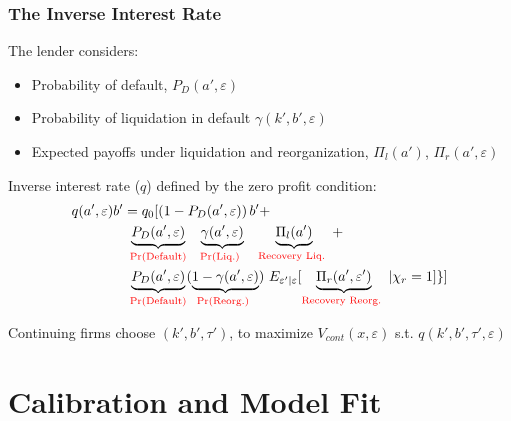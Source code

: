 \documentclass[aspectratio=169,xcolor=table]{beamer}
\begin{document}
\begin{frame}[label=Qfull] \frametitle{The Inverse Interest Rate  \hfill \hyperlink{mechanism}{} \hyperlink{ContFirms}{}}

The lender considers: \small 
\begin{itemize}\setlength\itemsep{0em} 
    \item Probability of default, $P_D(a', \varepsilon)$
    \item Probability of liquidation in default $\gamma(k',b', \varepsilon)$
    \item Expected payoffs under liquidation and reorganization,  $\Pi_{l}(a')$, $\Pi_{r}(a', \varepsilon)$
\end{itemize} \normalsize

Inverse interest rate ($q$) defined by the zero profit condition:
\begin{equation*} \label{eq:q}
    \begin{split}
        & q(a', \varepsilon)b' = q_0 [ \left(1-P_D(a', \varepsilon)\right)b' +  \\
        & \qquad \qquad \underbrace{P_D(a', \varepsilon)}_{\textcolor{red}{\text{Pr(Default)}}} \underbrace{\gamma(a', \varepsilon)}_{\textcolor{red}{\text{\quad Pr(Liq.) \quad }}} \underbrace{\Pi_{l}(a')}_{\textcolor{red}{\text{Recovery Liq. }}} + \\  
        & \qquad  \qquad \underbrace{P_D(a', \varepsilon)}_{\textcolor{red}{\text{Pr(Default)}}}  (\underbrace{1-\gamma(a', \varepsilon)}_{\textcolor{red}{\text{Pr(Reorg.) }}})\ E_{\varepsilon' | \varepsilon} [ \underbrace{\Pi_{r}(a', \varepsilon')}_{\textcolor{red}{\text{Recovery Reorg. }}} |\chi_r = 1 ] \} ]
    \end{split}
\end{equation*}

Continuing firms choose $(k',b',\tau')$, to maximize $V_{cont}(x,\varepsilon)$ s.t. $q(k',b',\tau', \varepsilon)$ 

\end{frame}


\section{Calibration and Model Fit}
\end{document}
